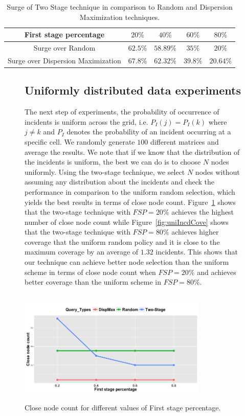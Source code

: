 \documentclass{acm_proc_article-sp}
\begin{document}
\begin{table}[!h]
\centering
\begin{tabulary}{0.5\textwidth}{|C|C|C|C|C|}
\hline
First stage percentage & $20\%$ & $40\%$  & $60\%$  & $80\%$  \\ \hline
Surge over Random   & $62.5\%$ & $58.89\%$  & $35\%$  & $20\%$  \\ \hline
Surge over Dispersion Maximization   & $67.8\%$ & $62.32\%$  & $39.8\%$  & $20.64\%$ \\ \hline
\end{tabulary}
\caption{Surge of Two Stage technique in comparison to Random and Dispersion Maximization techniques.}
\label{table:clusteredSurge}
\end{table}
\begin{figure}[!h]

\subsection{Uniformly distributed data experiments}
The next step of experiments, the probability of occurrence of incidents is uniform across the grid, i.e. $P_I (j) = P_I (k)$ where $j \neq k$ and $P_I$ denotes the probability of an incident occurring at a specific cell. We randomly generate $100$ different matrices and average the results. We note that if we know that the distribution of the incidents is uniform, the best we can do is to choose $N$ nodes uniformly. Using the two-stage technique, we select $N$ nodes without assuming any distribution about the incidents and check the performance in comparison to the uniform random selection, which yields the best results in terms of close node count. Figure~\ref{fig:uniClosePeople} shows that the two-stage technique with $FSP = 20\%$ achieves the highest number of close node count while Figure~\ref{fig:uniIncdCove} shows that the two-stage technique with $FSP = 80\%$ achieves higher coverage that the uniform random policy and it is close to the maximum coverage by an average of $1.32$ incidents. This shows that our technique can achieve better node selection than the uniform scheme in terms of close node count when $FSP = 20\%$ and achieves better coverage than the uniform scheme in $FSP = 80\%$.

\centering
\includegraphics[width=9cm ,height=5.5cm]{figuresPng/Uni_ClosePeople_Count.png}
\caption{Close node count for different values of First stage percentage. }
\label{fig:uniClosePeople}
\end{figure}
\end{document}
